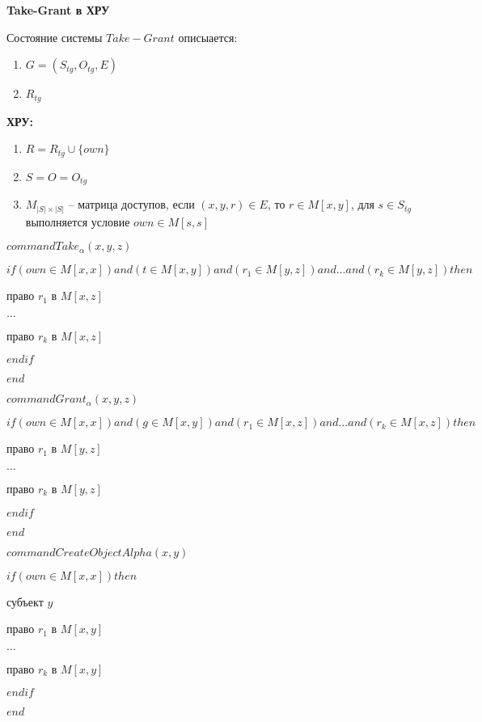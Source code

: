 \textbf{Take-Grant в ХРУ} 

Состояние системы $Take-Grant$ описыается:
\begin{enumerate}
	\item $G=(S_{tg}, O_{tg}, E)$
	\item $R_{tg}$
\end{enumerate}

\textbf{ХРУ:} 
\begin{enumerate}
	\item $R = R_{tg} \cup \{own\}$
	\item $S = O = O_{tg}$
	\item $M_{|S| \times |S|}$ -- матрица доступов, если $(x,y,r) \in E$, то $r \in M[x,y]$, для $s \in S_{tg}$ выполняется условие $own \in M[s,s]$
\end{enumerate}

		$command  Take_{\alpha}(x,y,z)$

		$if (own \in M[x,x]) and (t \in M[x,y])and (r_1 \in M[y,z])and  \ldots and (r_k \in M[y,z]) then $

		 право $r_1$ в $M[x,z]$
		
		$\ldots$

		 право $r_k$ в $M[x,z]$

		$endif$

		$end$
		
		
		
		$command  Grant_{\alpha}(x,y,z)$

		$if (own \in M[x,x]) and (g \in M[x,y])and (r_1 \in M[x,z])and  \ldots and (r_k \in M[x,z]) then $

		 право $r_1$ в $M[y,z]$
		
		$\ldots$

		 право $r_k$ в $M[y,z]$

		$endif$

		$end$
		
		
		
		$command  CreateObjectAlpha(x,y)$

		$if (own \in M[x,x]) then $
		
		 субъект $y$

		 право $r_1$ в $M[x,y]$
		
		$\ldots$

		 право $r_k$ в $M[x,y]$

		$endif$

		$end$
		
		
			
